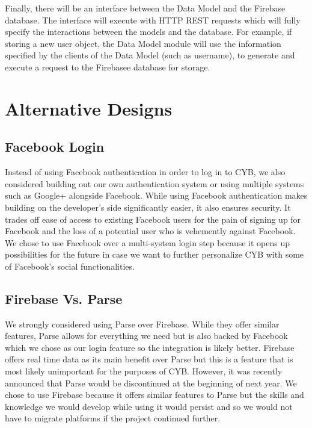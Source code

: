 \documentclass[11pt]{article}
\begin{document}
Finally, there will be an interface between the Data Model and the Firebase database. The interface will execute with HTTP REST requests which will fully specify the interactions between the models and the database. For example, if storing a new user object, the Data Model module will use the information specified by the clients of the Data Model (such as username), to generate and execute a request to the Firebasee database for storage.

\section*{Alternative Designs}

\subsection{Facebook Login}

Instead of using Facebook authentication in order to log in to CYB, we also considered building out our own authentication system or using multiple systems such as Google+ alongside Facebook. While using Facebook authentication makes building on the developer’s side significantly easier, it also ensures security. It trades off ease of access to existing Facebook users for the pain of signing up for Facebook and the loss of a potential user who is vehemently against Facebook. We chose to use Facebook over a multi-system login step because it opens up possibilities for the future in case we want to further personalize CYB with some of Facebook’s social functionalities.

\subsection{Firebase Vs. Parse}

We strongly considered using Parse over Firebase. While they offer similar features, Parse allows for everything we need but is also backed by Facebook which we chose as our login feature so the integration is likely better. Firebase offers real time data as its main benefit over Parse but this is a feature that is most likely unimportant for the purposes of CYB. However, it was recently announced that Parse would be discontinued at the beginning of next year. We chose to use Firebase because it offers similar features to Parse but the skills and knowledge we would develop while using it would persist and so we would not have to migrate platforms if the project continued further.
\end{document}
